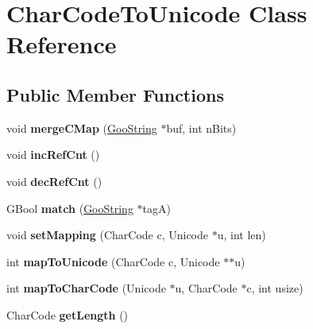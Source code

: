 \hypertarget{class_char_code_to_unicode}{}\section{Char\+Code\+To\+Unicode Class Reference}
\label{class_char_code_to_unicode}
\subsection*{Public Member Functions}
\begin{DoxyCompactItemize}
\item 
\mbox{\label{class_char_code_to_unicode_af6725e829396d7cc02c02c8209d69d58}} 
void {\bfseries merge\+C\+Map} (\hyperlink{class_goo_string}{Goo\+String} $\ast$buf, int n\+Bits)
\item 
\mbox{\label{class_char_code_to_unicode_a2d1a2c033a946df4b3b1a48cf4daa6fd}} 
void {\bfseries inc\+Ref\+Cnt} ()
\item 
\mbox{\label{class_char_code_to_unicode_acfd884500c5ed5ee6b6e4642621e5375}} 
void {\bfseries dec\+Ref\+Cnt} ()
\item 
\mbox{\label{class_char_code_to_unicode_a393e37eae66d4cf05be7348047374c7d}} 
G\+Bool {\bfseries match} (\hyperlink{class_goo_string}{Goo\+String} $\ast$tagA)
\item 
\mbox{\label{class_char_code_to_unicode_acfc2b0dab91f6279383de0227a40614f}} 
void {\bfseries set\+Mapping} (Char\+Code c, Unicode $\ast$u, int len)
\item 
\mbox{\label{class_char_code_to_unicode_afaafe9829e421f967bb7a96620375738}} 
int {\bfseries map\+To\+Unicode} (Char\+Code c, Unicode $\ast$$\ast$u)
\item 
\mbox{\label{class_char_code_to_unicode_ac2ee9df475744f17f164d66f58e52186}} 
int {\bfseries map\+To\+Char\+Code} (Unicode $\ast$u, Char\+Code $\ast$c, int usize)
\item 
\mbox{\label{class_char_code_to_unicode_a2ba797c4dd23f43825cc0b648f030ed0}} 
Char\+Code {\bfseries get\+Length} ()
\end{DoxyCompactItemize}
